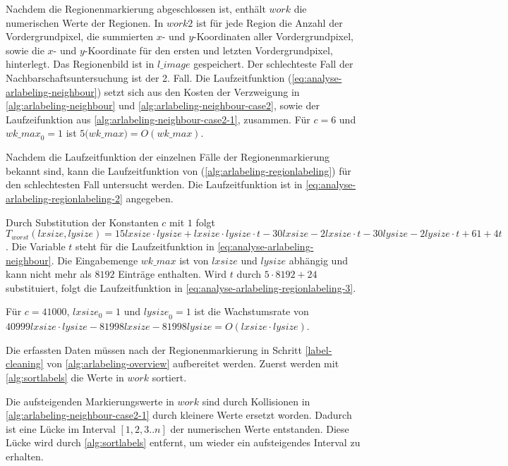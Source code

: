 Nachdem die Regionenmarkierung abgeschlossen ist, enthält $\mathit{work}$ die numerischen Werte der Regionen. In
 $\mathit{work2}$ ist für jede Region die Anzahl der Vordergrundpixel, die summierten $x$- und $y$-Koordinaten aller
 Vordergrundpixel, sowie die $x$- und $y$-Koordinate für den ersten und letzten Vordergrundpixel, hinterlegt. Das
 Regionenbild ist in $\mathit{l\_image}$ gespeichert. Der schlechteste Fall der Nachbarschaftsuntersuchung ist der 2.
 Fall. Die Laufzeitfunktion (\autoref{eq:analyse-arlabeling-neighbour}) setzt sich aus den Kosten der Verzweigung in
 \autoref{alg:arlabeling-neighbour} und \autoref{alg:arlabeling-neighbour-case2}, sowie der Laufzeifunktion aus
 \autoref{alg:arlabeling-neighbour-case2-1}, zusammen. Für $c = 6$ und $\mathit{wk\_max}_{0} = 1$ ist
 $5 \mathit(wk\_max) = O(\mathit{wk\_max})$.


Nachdem die Laufzeitfunktion der einzelnen Fälle der Regionenmarkierung bekannt sind, kann die Laufzeitfunktion von
  (\autoref{alg:arlabeling-regionlabeling}) für den schlechtesten Fall untersucht werden. Die
 Laufzeitfunktion ist in \autoref{eq:analyse-arlabeling-regionlabeling-2} angegeben.

Durch Substitution der Konstanten $c$ mit $1$ folgt $T_{worst}(\mathit{lxsize},\mathit{lysize}) = 15 \mathit{lxsize}
 \cdot \mathit{lysize} + \mathit{lxsize} \cdot \mathit{lysize} \cdot t - 30 \mathit{lxsize} - 2 \mathit{lxsize} \cdot t
 -30 \mathit{lysize} - 2 \mathit{lysize} \cdot t + 61 + 4t$. Die Variable $t$ steht für die Laufzeitfunktion in
 \autoref{eq:analyse-arlabeling-neighbour}. Die Eingabemenge $\mathit{wk\_max}$ ist von $\mathit{lxsize}$ und
 $\mathit{lysize}$ abhängig und kann nicht mehr als $8192$ Einträge enthalten. Wird $t$ durch $5 \cdot 8192 + 24$
 substituiert, folgt die Laufzeitfunktion in \autoref{eq:analyse-arlabeling-regionlabeling-3}.

Für $c = 41000$, $\mathit{lxsize}_{0} = 1$ und $\mathit{lysize}_{0} = 1$ ist die Wachstumsrate von
 $40999\mathit{lxsize}\cdot\mathit{lysize} -81998\mathit{lxsize} -81998\mathit{lysize}
 = O(\mathit{lxsize}\cdot\mathit{lysize})$.

Die erfassten Daten müssen nach der Regionenmarkierung in Schritt \ref{label-cleaning} von
 \autoref{alg:arlabeling-overview} aufbereitet werden. Zuerst werden mit \autoref{alg:sortlabels} die Werte in
 $\mathit{work}$ sortiert.

Die aufsteigenden Markierungswerte in $\mathit{work}$ sind durch Kollisionen in
 \autoref{alg:arlabeling-neighbour-case2-1} durch kleinere Werte ersetzt worden. Dadurch ist eine Lücke im Interval
 $\left[1,2,3..n\right]$ der numerischen Werte entstanden. Diese Lücke wird durch \autoref{alg:sortlabels}
 entfernt, um wieder ein aufsteigendes Interval zu erhalten.

